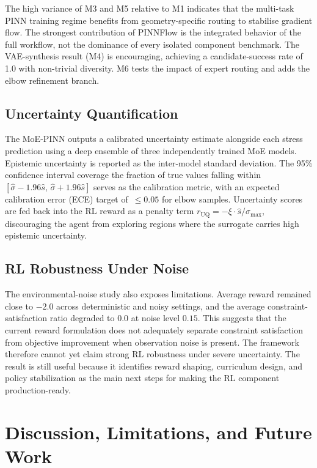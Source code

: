 \documentclass[conference]{IEEEtran}
\begin{document}
The high variance of M3 and M5 relative to M1 indicates that the multi-task PINN training regime benefits from geometry-specific routing to stabilise gradient flow. The strongest contribution of PINNFlow is the integrated behavior of the full workflow, not the dominance of every isolated component benchmark. The VAE-synthesis result (M4) is encouraging, achieving a candidate-success rate of 1.0 with non-trivial diversity. M6 tests the impact of expert routing and adds the elbow refinement branch.
 
\subsection{Uncertainty Quantification}

The MoE-PINN outputs a calibrated uncertainty estimate alongside each stress prediction using a deep ensemble of three independently trained MoE models. Epistemic uncertainty is reported as the inter-model standard deviation. The 95\% confidence interval coverage the fraction of true values falling within $[\hat{\sigma} - 1.96\hat{s},\, \hat{\sigma} + 1.96\hat{s}]$ serves as the calibration metric, with an expected calibration error (ECE) target of~$\leq 0.05$ for elbow samples. Uncertainty scores are fed back into the RL reward as a penalty term $r_{\text{UQ}} = -\xi \cdot \hat{s} / \sigma_{\text{max}}$, discouraging the agent from exploring regions where the surrogate carries high epistemic uncertainty.

\subsection{RL Robustness Under Noise}

The environmental-noise study also exposes limitations. Average reward remained close to \(-2.0\) across deterministic and noisy settings, and the average constraint-satisfaction ratio degraded to \(0.0\) at noise level \(0.15\). This suggests that the current reward formulation does not adequately separate constraint satisfaction from objective improvement when observation noise is present. The framework therefore cannot yet claim strong RL robustness under severe uncertainty. The result is still useful because it identifies reward shaping, curriculum design, and policy stabilization as the main next steps for making the RL component production-ready.
 
\section{Discussion, Limitations, and Future Work}
\end{document}
